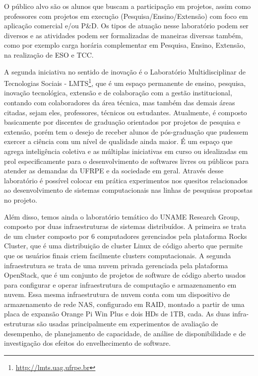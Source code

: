 O público alvo são os alunos que buscam a participação em projetos, assim como professores com projetos em execução (Pesquisa/Ensino/Extensão) com foco em aplicação comercial e/ou P\&D. Os tipos de atuação nesse laboratório podem ser diversos e as atividades podem ser formalizadas de maneiras diversas também, como por exemplo carga horária complementar em Pesquisa, Ensino, Extensão, na realização de ESO e TCC.

A segunda iniciativa no sentido de inovação é o Laboratório Multidisciplinar de Tecnologias Sociais - LMTS\footnote{\url{http://lmts.uag.ufrpe.br}}, que é um espaço permanente de ensino, pesquisa, inovação tecnológica, extensão e de colaboração com a gestão institucional, contando com colaboradores da área técnica, mas também das demais áreas citadas, sejam eles, professores, técnicos ou estudantes. Atualmente, é composto basicamente por discentes de graduação orientados por projetos de pesquisa e extensão, porém tem o desejo de receber alunos de pós-graduação que pudessem exercer a ciência com um nível de qualidade ainda maior. É um espaço que agrega inteligência coletiva e as múltiplas iniciativas em curso ou idealizadas em prol especificamente para o desenvolvimento de softwares livres ou públicos para atender as demandas da UFRPE e da sociedade em geral. Através desse laboratório é possível colocar em prática experimentos nos quesitos relacionados ao desenvolvimento de sistemas computacionais nas linhas de pesquisas propostas no projeto.

Além disso, temos ainda o laboratório temático do UNAME Research Group, composto por duas infraestruturas de sistemas distribuídos. A primeira se trata de um cluster composto por 6 computadores gerenciados pela plataforma Rocks Cluster, que é uma distribuição de cluster Linux de código aberto que permite que os usuários finais criem facilmente clusters computacionais. A segunda infraestrutura se trata de uma nuvem privada gerenciada pela plataforma OpenStack, que é um conjunto de projetos de software de código aberto usados para configurar e operar infraestrutura de computação e armazenamento em nuvem. Essa mesma infraestrutura de nuvem conta com um dispositivo de armazenamento de rede NAS, configurado em RAID, montado a partir de uma placa de expansão Orange Pi Win Plus e dois HDs de 1TB, cada. As duas infra-estruturas são usadas principalmente em experimentos de avaliação de desempenho, de planejamento de capacidade, de análise de disponibilidade e de investigação dos efeitos do envelhecimento de software. 

